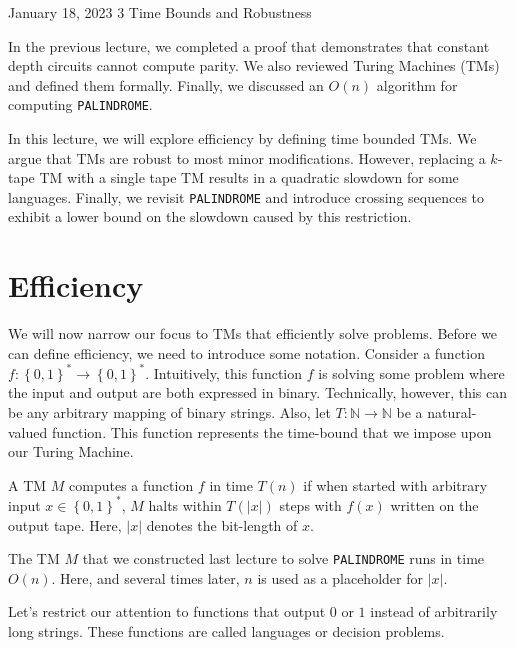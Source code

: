 \documentclass[usletter]{article}
\begin{document}
           {January 18, 2023}                          %
           {3}                                       %
           {Time Bounds and Robustness}  %

\noindent
In the previous lecture, we completed a proof that demonstrates that
constant depth circuits cannot compute parity. We also reviewed Turing Machines (TMs) and defined them formally.
Finally, we discussed an \(O(n)\) algorithm for computing \verb|PALINDROME|. 

In this lecture, we will explore efficiency by defining time bounded TMs. We argue that TMs are robust to most minor modifications. 
However, replacing a \(k\)-tape TM with a single tape TM results in a quadratic slowdown for some languages.
Finally, we revisit \verb|PALINDROME| and introduce crossing sequences to exhibit a lower bound on the slowdown caused by this restriction. 

\section{Efficiency}
We will now narrow our focus to TMs that efficiently solve problems.
Before we can define efficiency, we need to introduce some notation. Consider a function \(f: \left\{ 0,1 \right\}^* \to \left\{  0,1 \right\}^*\). 
Intuitively, this function \(f\) is solving some problem where the input and output are both expressed in binary. Technically, however, this can be any
arbitrary mapping of binary strings. Also, let \(T: \mathbb{N} \to \mathbb{N}\) be a natural-valued function. This function represents the time-bound that we impose
upon our Turing Machine. 

\begin{definition}
    A TM \(M\) computes a function \(f\) in time \(T(n)\) if when started with arbitrary input \(x \in \left\{ 0,1 \right\}^*\), \(M\) halts within \(T(|x|)\) steps with \(f(x)\) 
    written on the output tape. Here, \(|x|\) denotes the bit-length of \(x\).
\end{definition}

\begin{example}
    The TM \(M\) that we constructed last lecture to solve \verb|PALINDROME| runs in time \(O(n)\). Here, and several times later, \(n\) is used as a placeholder for \(|x|\).
\end{example}

Let's restrict our attention to functions that output \(0\) or \(1\) instead of arbitrarily long strings. These functions are called languages or decision problems.
\end{document}
